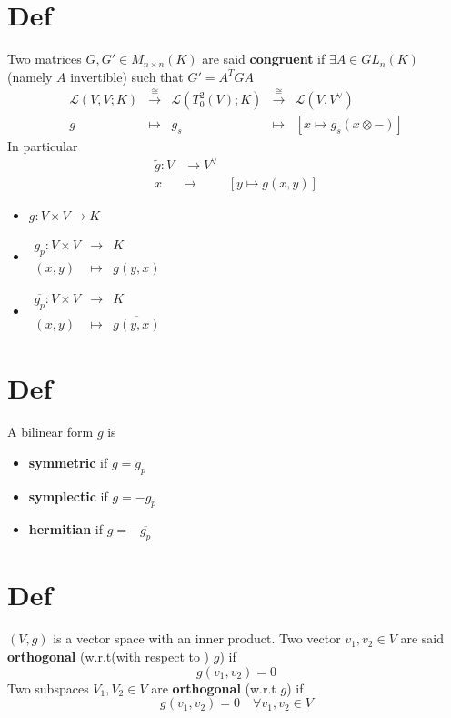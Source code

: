 \documentclass{book}
\begin{document}
\section{Def}
Two matrices $G,G'\in M_{n\times n}(K)$ are said \textbf{congruent} if $\exists A\in GL_n(K)$ (namely $A$ invertible) such that $G'=A^TGA$
$$\begin{aligned}
    \mathscr{L}(V,V;K)&\stackrel{\cong}\rightarrow&\mathscr{L}(T_0^2(V);K)&\stackrel{\cong}\rightarrow&\mathscr{L}(V,V^\vee)\\
    g&\mapsto&g_s&\mapsto&[x\mapsto g_s(x\otimes -)]
\end{aligned}$$
In particular
$$\begin{aligned}
    \tilde{g}:V&\rightarrow V^\vee\\
    x&\mapsto&[y\mapsto g(x,y)]
\end{aligned}$$
\begin{itemize}
    \item $g:V\times V\rightarrow K$
    \item $\begin{aligned}
        g_p:V\times V&\rightarrow& K\\(x,y)&\mapsto&g(y,x)
    \end{aligned}$
    \item$\begin{aligned}
        \overline{g_p}:V\times V&\rightarrow& K\\(x,y)&\mapsto&\overline{g(y,x)}
    \end{aligned}$
\end{itemize}
\section{Def}
A bilinear form $g$ is 
\begin{itemize}
    \item \textbf{symmetric} if $g=g_p$
    \item \textbf{symplectic} if $g=-g_p$
    \item \textbf{hermitian} if $g=-\overline{g_p}$ 
\end{itemize}
\section{Def}
$(V,g)$ is a vector space with an inner product. Two vector $v_1,v_2\in V$ are said \textbf{orthogonal} (w.r.t(with respect to ) $g$) if$$g(v_1,v_2)=0$$
Two subspaces $V_1,V_2\in V$ are \textbf{orthogonal} (w.r.t $g$) if $$g(v_1,v_2)=0\quad\forall v_1,v_2\in V$$
\end{document}
